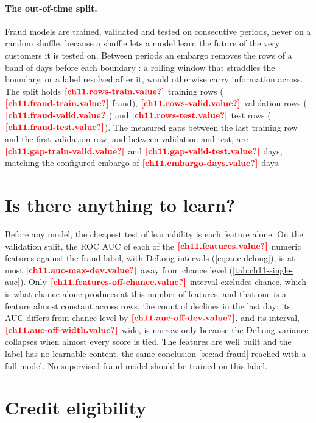 \paragraph{The out-of-time split.} Fraud models are trained, validated and tested on consecutive periods, never on a
random shuffle, because a shuffle lets a model learn the future of the very customers it is tested on. Between periods
an embargo removes the rows of a band of days before each boundary \autocite{lopezdeprado2018}: a rolling window that
straddles the boundary, or a label resolved after it, would otherwise carry information across. The split holds
$\est{ch11.rows-train}{value}$ training rows ($\est{ch11.fraud-train}{value}$ fraud), $\est{ch11.rows-valid}{value}$ validation
rows ($\est{ch11.fraud-valid}{value}$) and $\est{ch11.rows-test}{value}$ test rows ($\est{ch11.fraud-test}{value}$). The
measured gaps between the last training row and the first validation row, and between validation and test, are
$\est{ch11.gap-train-valid}{value}$ and $\est{ch11.gap-valid-test}{value}$ days, matching the configured embargo of
$\est{ch11.embargo-days}{value}$ days.

\section{Is there anything to learn?}\label{sec:mf-signal}

Before any model, the cheapest test of learnability is each feature alone. On the validation split, the ROC AUC of each of
the $\est{ch11.features}{value}$ numeric features against the fraud label, with DeLong intervals (\cref{eq:auc-delong}), is
at most $\est{ch11.auc-max-dev}{value}$ away from chance level (\cref{tab:ch11-single-auc}). Only
$\est{ch11.features-off-chance}{value}$ interval excludes chance, which is what chance alone produces at this number of
features, and that one is a feature almost constant across rows, the count of declines in the last day: its AUC differs
from chance level by $\est{ch11.auc-off-dev}{value}$, and its interval, $\est{ch11.auc-off-width}{value}$ wide, is narrow only
because the DeLong variance collapses when almost every score is tied. The features are well built and the label has no
learnable content, the same conclusion \cref{sec:ad-fraud} reached with a full model. No supervised fraud model should be
trained on this label.



\section{Credit eligibility}\label{sec:mf-credit}

